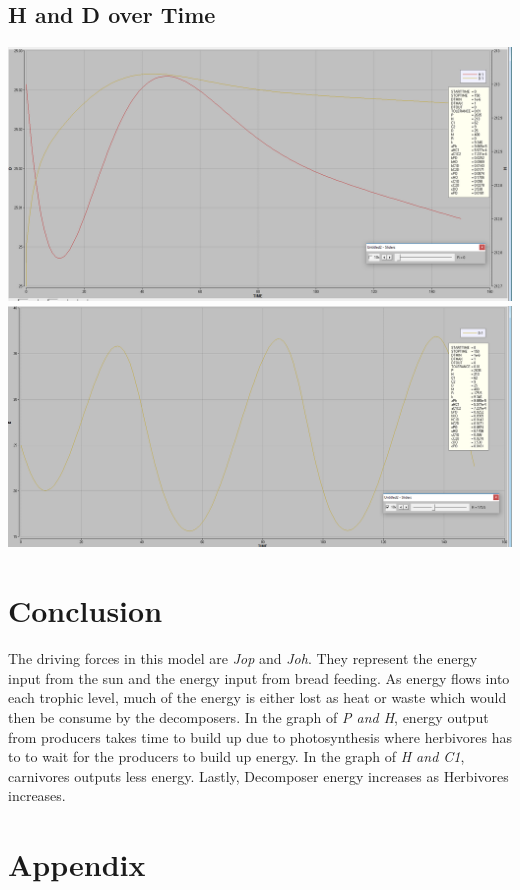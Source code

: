 \documentclass [12pt] {article}
\begin{document}
\subsection{H and D over Time}
\includegraphics[scale=0.3]{graph4a.png} \\
\includegraphics[scale=0.3]{graph4b.png}

\section{Conclusion}
The driving forces in this model are \textit{Jop} and \textit{Joh}. They represent the energy input from the sun and the energy input from bread feeding. As energy flows into each trophic level, much of the energy is either lost as heat or waste which would then be consume by the decomposers.  In the graph of \textit{P and H}, energy output from producers takes time to build up due to photosynthesis where herbivores has to to wait for the producers to build up energy. In the graph of \textit{H and C1}, carnivores outputs less energy. Lastly, Decomposer energy increases as Herbivores increases.
\newpage

\section{Appendix}
% 
% 
\end{document}
